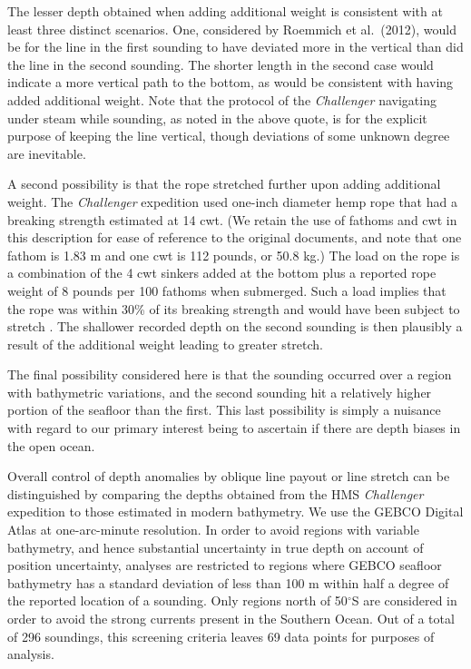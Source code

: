 \documentclass[12pt]{article}
\begin{document}
The lesser depth obtained when adding additional weight is consistent
with at least three distinct scenarios. One, considered by Roemmich et
al.~(2012), would be for the line in the first sounding to have
deviated more in the vertical than did the line in the second
sounding.  The shorter length in the second case would indicate a more
vertical path to the bottom, as would be consistent with having added
additional weight.  Note that the protocol of the {\it Challenger}
navigating under steam while sounding, as noted in the above quote, is
for the explicit purpose of keeping the line vertical, though
deviations of some unknown degree are inevitable.
 
A second possibility is that the rope stretched further upon adding
additional weight.  The {\it Challenger} expedition used one-inch
diameter hemp rope that had a breaking strength estimated at 14
cwt.  (We retain the use of fathoms and cwt in this description for
ease of reference to the original documents, and note that one fathom
is 1.83 m and one cwt is 112 pounds, or 50.8 kg.) The load on the rope
is a combination of the 4 cwt sinkers added at the bottom plus a
reported rope weight of 8 pounds per 100 fathoms when submerged.  Such
a load implies that the rope was within 30\% of its breaking strength
and would have been subject to stretch
\cite{McKenna-Hearle-2004:Handbook}. The shallower recorded depth on
the second sounding is then plausibly a result of the additional
weight leading to greater stretch.

The final possibility considered here is that the sounding occurred
over a region with bathymetric variations, and the second sounding
hit a relatively higher portion of the seafloor than the first.  This
last possibility is simply a nuisance with regard to our primary
interest being to ascertain if there are depth biases in the open
ocean.

Overall control of depth anomalies by oblique line payout or line
stretch can be distinguished by comparing the depths obtained from the
HMS {\it Challenger} expedition to those estimated in modern
bathymetry.  We use the GEBCO Digital Atlas
\cite{Intergovernm--2003:BODC} at one-arc-minute resolution.  In order
to avoid regions with variable bathymetry, and hence substantial
uncertainty in true depth on account of position uncertainty, analyses
are restricted to regions where GEBCO seafloor bathymetry has a
standard deviation of less than 100 m within half a degree of the
reported location of a sounding.  Only regions north of 50$^\circ$S
are considered in order to avoid the strong currents present in the
Southern Ocean.  Out of a total of 296 soundings, this screening
criteria leaves 69 data points for purposes of analysis.
\end{document}
